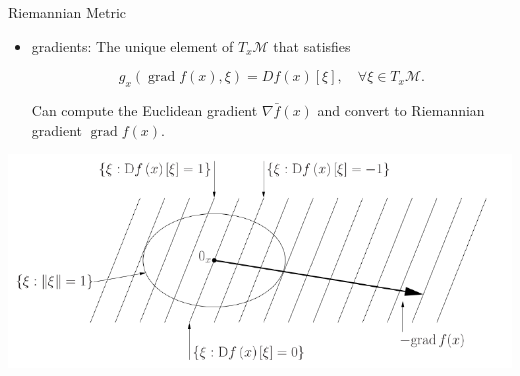 \documentclass[xcolor=dvipsnames,t]{beamer} %
\begin{document}
\begin{frame}{Riemannian Metric}
   \begin{itemize}
      \item gradients: The unique element of $T_x\mathcal{M}$ that satisfies
         
         \[ g_x(\operatorname{grad}f(x),\xi) = Df(x)[\xi], \quad \forall \xi\in T_x\mathcal{M}. \] 

         \noindent Can compute the Euclidean gradient $\nabla \bar{f}(x)$ and convert to Riemannian gradient $\operatorname{grad}f(x)$.

   \end{itemize}

   \begin{center}
      \includegraphics[width=\textwidth]{figures/gradient.pdf}
   \end{center}
\end{frame}

\end{document}
